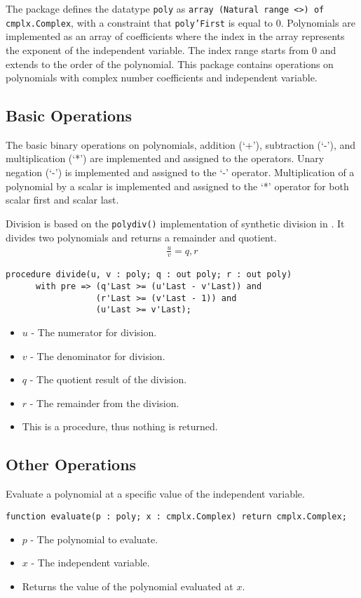 \documentclass[10pt, openany]{book}
\newcommand{\function}[1]{\texttt{#1}}
\newcommand{\datatype}[1]{\texttt{#1}}
\begin{document}
The package defines the datatype \datatype{poly} as \datatype{array (Natural range  <>) of cmplx.Complex}, with a constraint that \datatype{poly'First} is equal to 0.  Polynomials are implemented as an array of coefficients where the index in the array represents the exponent of the independent variable.  The index range starts from 0 and extends to the order of the polynomial.  This package contains operations on polynomials with complex number coefficients and independent variable.

\subsection{Basic Operations}
The basic binary operations on polynomials, addition (`+'), subtraction (`-'), and multiplication (`*') are implemented and assigned to the operators.  Unary negation (`-') is implemented and assigned to the `-' operator.  Multiplication of a polynomial by a scalar is implemented and assigned to the `*' operator for both scalar first and scalar last.

Division is based on the \function{polydiv()} implementation of synthetic division in \cite{NR-C}.  It divides two polynomials and returns a remainder and quotient.
\begin{align*}
  \frac{u}{v} = q, r
\end{align*}
\begin{lstlisting}
procedure divide(u, v : poly; q : out poly; r : out poly)
      with pre => (q'Last >= (u'Last - v'Last)) and
                  (r'Last >= (v'Last - 1)) and
                  (u'Last >= v'Last);
\end{lstlisting}
\begin{itemize}
  \item $u$ - The numerator for division.
  \item $v$ - The denominator for division.
  \item $q$ - The quotient result of the division.
  \item $r$ - The remainder from the division.
  \item This is a procedure, thus nothing is returned.
\end{itemize}

\subsection{Other Operations}

Evaluate a polynomial at a specific value of the independent variable.
\begin{lstlisting}
function evaluate(p : poly; x : cmplx.Complex) return cmplx.Complex;
\end{lstlisting}
\begin{itemize}
  \item $p$ - The polynomial to evaluate.
  \item $x$ - The independent variable.
  \item Returns the value of the polynomial evaluated at $x$.
\end{itemize}
\end{document}
